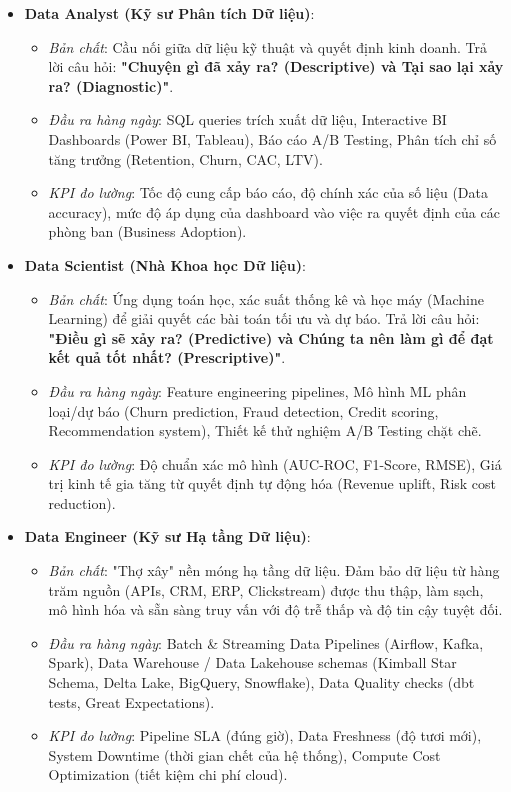 \begin{lythuyetbox}
\begin{itemize}[leftmargin=*]
    \item \textbf{Data Analyst (Kỹ sư Phân tích Dữ liệu)}:
    \begin{itemize}
        \item \textit{Bản chất}: Cầu nối giữa dữ liệu kỹ thuật và quyết định kinh doanh. Trả lời câu hỏi: \textbf{"Chuyện gì đã xảy ra? (Descriptive) và Tại sao lại xảy ra? (Diagnostic)"}.
        \item \textit{Đầu ra hàng ngày}: SQL queries trích xuất dữ liệu, Interactive BI Dashboards (Power BI, Tableau), Báo cáo A/B Testing, Phân tích chỉ số tăng trưởng (Retention, Churn, CAC, LTV).
        \item \textit{KPI đo lường}: Tốc độ cung cấp báo cáo, độ chính xác của số liệu (Data accuracy), mức độ áp dụng của dashboard vào việc ra quyết định của các phòng ban (Business Adoption).
    \end{itemize}
    \item \textbf{Data Scientist (Nhà Khoa học Dữ liệu)}:
    \begin{itemize}
        \item \textit{Bản chất}: Ứng dụng toán học, xác suất thống kê và học máy (Machine Learning) để giải quyết các bài toán tối ưu và dự báo. Trả lời câu hỏi: \textbf{"Điều gì sẽ xảy ra? (Predictive) và Chúng ta nên làm gì để đạt kết quả tốt nhất? (Prescriptive)"}.
        \item \textit{Đầu ra hàng ngày}: Feature engineering pipelines, Mô hình ML phân loại/dự báo (Churn prediction, Fraud detection, Credit scoring, Recommendation system), Thiết kế thử nghiệm A/B Testing chặt chẽ.
        \item \textit{KPI đo lường}: Độ chuẩn xác mô hình (AUC-ROC, F1-Score, RMSE), Giá trị kinh tế gia tăng từ quyết định tự động hóa (Revenue uplift, Risk cost reduction).
    \end{itemize}
    \item \textbf{Data Engineer (Kỹ sư Hạ tầng Dữ liệu)}:
    \begin{itemize}
        \item \textit{Bản chất}: "Thợ xây" nền móng hạ tầng dữ liệu. Đảm bảo dữ liệu từ hàng trăm nguồn (APIs, CRM, ERP, Clickstream) được thu thập, làm sạch, mô hình hóa và sẵn sàng truy vấn với độ trễ thấp và độ tin cậy tuyệt đối.
        \item \textit{Đầu ra hàng ngày}: Batch \& Streaming Data Pipelines (Airflow, Kafka, Spark), Data Warehouse / Data Lakehouse schemas (Kimball Star Schema, Delta Lake, BigQuery, Snowflake), Data Quality checks (dbt tests, Great Expectations).
        \item \textit{KPI đo lường}: Pipeline SLA (đúng giờ), Data Freshness (độ tươi mới), System Downtime (thời gian chết của hệ thống), Compute Cost Optimization (tiết kiệm chi phí cloud).
    \end{itemize}
\end{itemize}
\end{lythuyetbox}

